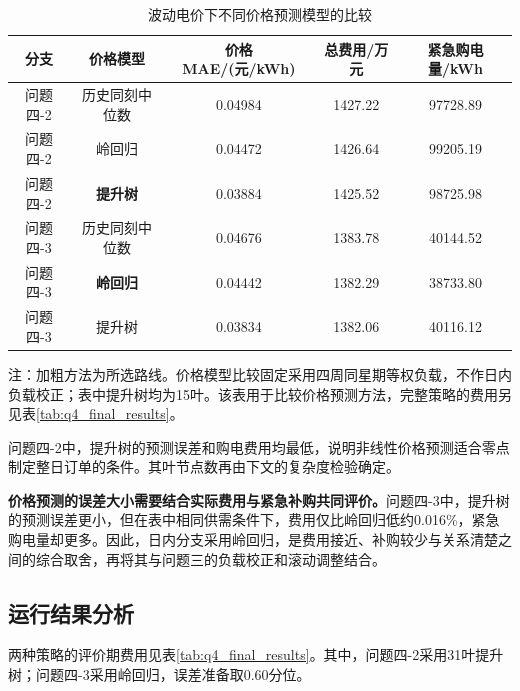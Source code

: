 \begin{table}[!htbp]
    \centering
    \caption{波动电价下不同价格预测模型的比较}
    \label{tab:q4_price_comparison}
    \begin{tabular}{ccccc}
        \hline
        分支 & 价格模型 & 价格MAE/(元/kWh) & 总费用/万元 & 紧急购电量/kWh \\
        \hline
        问题四-2 & 历史同刻中位数 & 0.04984 & 1427.22 & 97728.89 \\
        问题四-2 & 岭回归 & 0.04472 & 1426.64 & 99205.19 \\
        问题四-2 & \textbf{提升树} & 0.03884 & 1425.52 & 98725.98 \\
        \hline
        问题四-3 & 历史同刻中位数 & 0.04676 & 1383.78 & 40144.52 \\
        问题四-3 & \textbf{岭回归} & 0.04442 & 1382.29 & 38733.80 \\
        问题四-3 & 提升树 & 0.03834 & 1382.06 & 40116.12 \\
        \hline
    \end{tabular}
    \par\smallskip
    \begin{minipage}{0.96\textwidth}
    \small 注：加粗方法为所选路线。价格模型比较固定采用四周同星期等权负载，不作日内负载校正；表中提升树均为15叶。该表用于比较价格预测方法，完整策略的费用另见表\ref{tab:q4_final_results}。
    \end{minipage}
\end{table}

问题四-2中，提升树的预测误差和购电费用均最低，说明非线性价格预测适合零点制定整日订单的条件。其叶节点数再由下文的复杂度检验确定。

\textbf{价格预测的误差大小需要结合实际费用与紧急补购共同评价。}问题四-3中，提升树的预测误差更小，但在表中相同供需条件下，费用仅比岭回归低约0.016\%，紧急购电量却更多。因此，日内分支采用岭回归，是费用接近、补购较少与关系清楚之间的综合取舍，再将其与问题三的负载校正和滚动调整结合。

\subsection{运行结果分析}

两种策略的评价期费用见表\ref{tab:q4_final_results}。其中，问题四-2采用31叶提升树；问题四-3采用岭回归，误差准备取0.60分位。

